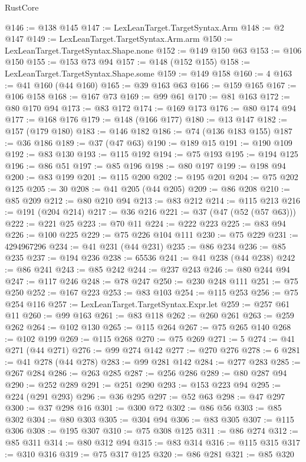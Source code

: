 \begin{lexlean}{RustCore}
\begin{coremodule}
@146 := @138 @145
@147 := LexLeanTarget.TargetSyntax.Arm
@148 := @2 @147
@149 := LexLeanTarget.TargetSyntax.Arm.arm
@150 := LexLeanTarget.TargetSyntax.Shape.none
@152 := @149 @150 @63
@153 := @106 @150
@155 := @153 @73 @94
@157 := @148 (@152 @155)
@158 := LexLeanTarget.TargetSyntax.Shape.some
@159 := @149 @158
@160 := 4
@163 := @41 @160 (@44 @160)
@165 := @39 @163 @63
@166 := @159 @165
@167 := @106 @158
@168 := @167 @73
@169 := @99 @61
@170 := @81 @163
@172 := @80 @170 @94
@173 := @83 @172
@174 := @169 @173
@176 := @80 @174 @94
@177 := @168 @176
@179 := @148 (@166 @177)
@180 := @13 @147
@182 := @157 (@179 @180)
@183 := @146 @182
@186 := @74 (@136 @183 @155)
@187 := @36 @186
@189 := @37 (@47 @63)
@190 := @189 @15
@191 := @190 @109
@192 := @83 @130
@193 := @115 @192
@194 := @75 @193
@195 := @194 @125
@196 := @86 @51
@197 := @85 @196
@198 := @80 @197
@199 := @198 @94
@200 := @83 @199
@201 := @115 @200
@202 := @195 @201
@204 := @75 @202 @125
@205 := 30
@208 := @41 @205 (@44 @205)
@209 := @86 @208
@210 := @85 @209
@212 := @80 @210 @94
@213 := @83 @212
@214 := @115 @213
@216 := @191 (@204 @214)
@217 := @36 @216
@221 := @37 (@47 (@52 (@57 @63)))
@222 := @221 @25
@223 := @70 @11
@224 := @222 @223
@225 := @83 @94
@226 := @100 @225
@229 := @75 @226 @104 @111
@230 := @75 @229
@231 := 4294967296
@234 := @41 @231 (@44 @231)
@235 := @86 @234
@236 := @85 @235
@237 := @194 @236
@238 := 65536
@241 := @41 @238 (@44 @238)
@242 := @86 @241
@243 := @85 @242
@244 := @237 @243
@246 := @80 @244 @94
@247 := @117 @246
@248 := @78 @247
@250 := @230 @248 @111
@251 := @75 @250
@252 := @167 @223
@253 := @83 @103
@254 := @115 @253
@256 := @75 @254 @116
@257 := LexLeanTarget.TargetSyntax.Expr.let
@259 := @257 @61 @11
@260 := @99 @163
@261 := @83 @118
@262 := @260 @261
@263 := @259 @262
@264 := @102 @130
@265 := @115 @264
@267 := @75 @265 @140
@268 := @102 @199
@269 := @115 @268
@270 := @75 @269
@271 := 5
@274 := @41 @271 (@44 @271)
@276 := @99 @274 @142
@277 := @270 @276
@278 := 6
@281 := @41 @278 (@44 @278)
@283 := @99 @281 @142
@284 := @277 @283
@285 := @267 @284
@286 := @263 @285
@287 := @256 @286
@289 := @80 @287 @94
@290 := @252 @289
@291 := @251 @290
@293 := @153 @223 @94
@295 := @224 (@291 @293)
@296 := @36 @295
@297 := @52 @63
@298 := @47 @297
@300 := @37 @298 @16
@301 := @300 @72
@302 := @86 @56
@303 := @85 @302
@304 := @80 @303
@305 := @304 @94
@306 := @83 @305
@307 := @115 @306
@308 := @195 @307
@310 := @75 @308 @125
@311 := @86 @274
@312 := @85 @311
@314 := @80 @312 @94
@315 := @83 @314
@316 := @115 @315
@317 := @310 @316
@319 := @75 @317 @125
@320 := @86 @281
@321 := @85 @320

\end{coremodule}
\end{lexlean}

